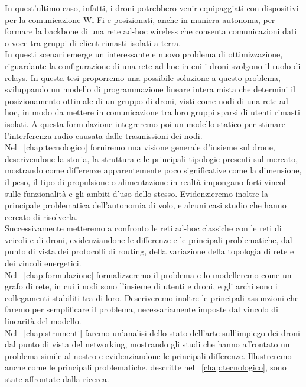 In quest'ultimo caso, infatti, i droni potrebbero venir equipaggiati con dispositivi per la comunicazione Wi-Fi e posizionati, anche in maniera autonoma, per formare la backbone di una rete ad-hoc wireless che consenta comunicazioni dati o voce tra gruppi di client rimasti isolati a terra. \\
In questi scenari emerge un interessante e nuovo problema di ottimizzazione, riguardante la configurazione di una rete ad-hoc in cui i droni svolgono il ruolo di relays.
In questa tesi proporremo una possibile soluzione a questo problema, sviluppando un modello di programmazione lineare intera mista che determini il posizionamento ottimale di un gruppo di droni, visti come nodi di una rete ad-hoc, in modo da mettere in comunicazione tra loro gruppi sparsi di utenti rimasti isolati. A questa formulazione integreremo poi un modello statico per stimare l'interferenza radio causata dalle trasmissioni dei nodi. \\
Nel \chaptername\ \ref{chap:tecnologico} forniremo una visione generale d'insieme sul drone, descrivendone la storia, la struttura e le principali tipologie presenti sul mercato, mostrando come differenze apparentemente poco significative come la dimensione, il peso, il tipo di propulsione o alimentazione in realtà impongano forti vincoli sulle funzionalità e gli ambiti d'uso dello stesso. Evidenzieremo inoltre la principale problematica  dell'autonomia di volo, e alcuni casi studio che hanno cercato di risolverla. \\
Successivamente metteremo a confronto le reti ad-hoc classiche con le reti di veicoli e di droni, evidenziandone le differenze e le principali problematiche, dal punto di vista dei protocolli di routing, della variazione della topologia di rete e dei vincoli energetici.\\
Nel \chaptername\ \ref{chap:formulazione} formalizzeremo il problema e lo modelleremo come un grafo di rete, in cui i nodi sono l'insieme di utenti e droni, e gli archi sono i collegamenti stabiliti tra di loro. Descriveremo inoltre le principali assunzioni che faremo per semplificare il problema, necessariamente imposte dal vincolo di linearità del modello. \\
Nel \chaptername\ \ref{chap:strumenti} faremo un'analisi dello stato dell'arte sull'impiego dei droni dal punto di vista del networking, mostrando gli studi che hanno affrontato un problema simile al nostro e evidenziandone le principali differenze. Illustreremo anche come le principali problematiche, descritte nel \chaptername\ \ref{chap:tecnologico}, sono state affrontate dalla ricerca. 
